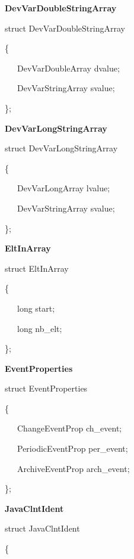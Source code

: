 \begin{flushleft}
\textbf{DevVarDoubleStringArray}
\par\end{flushleft}

struct DevVarDoubleStringArray

\{

~~~DevVarDoubleArray dvalue;

~~~DevVarStringArray svalue;

\};\\

\begin{flushleft}
\textbf{DevVarLongStringArray}
\par\end{flushleft}

struct DevVarLongStringArray

\{

~~~DevVarLongArray lvalue;

~~~DevVarStringArray svalue;

\};\\

\begin{flushleft}
\textbf{EltInArray}
\par\end{flushleft}

struct EltInArray

\{

~~~long start;

~~~long nb\_elt;

\};\\

\begin{flushleft}
\textbf{EventProperties}
\par\end{flushleft}

struct EventProperties

\{

~~~ChangeEventProp ch\_event;

~~~PeriodicEventProp per\_event;

~~~ArchiveEventProp arch\_event;

\};\\

\begin{flushleft}
\textbf{JavaClntIdent}
\par\end{flushleft}

struct JavaClntIdent

\{

